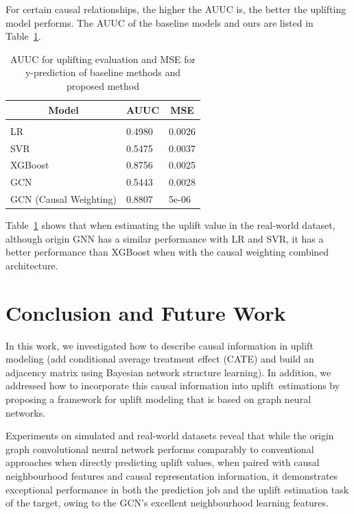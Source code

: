 \documentclass[sigconf,screen]{acmart}
\begin{document}
For certain causal relationships, the higher the AUUC is, the better the uplifting model performs. The AUUC of the baseline models and ours are listed in Table~\ref{auuc_res}.

\begin{table}
\centering
\caption{AUUC for uplifting evaluation and MSE for y-prediction of baseline methods and proposed method}
\label{auuc_res}
\begin{center}
\begin{tabular}{lll}
\multicolumn{1}{c}{\bf Model}  &\multicolumn{1}{c}{\bf AUUC} &\multicolumn{1}{c}{\bf MSE}
\\ \hline \\
LR & 0.4980 & 0.0026\\
SVR &  0.5475 & 0.0037\\
XGBoost &  0.8756 & 0.0025 \\
GCN & 0.5443 & 0.0028 \\
GCN (Causal Weighting) & 0.8807 & 5e-06 \\
\end{tabular}    
\end{center}
\end{table}

Table~\ref{auuc_res} shows that when estimating the uplift value in the real-world dataset, although origin GNN has a similar performance with LR and SVR, it has a better performance than XGBoost when with the causal weighting combined architecture.




\section{Conclusion and Future Work}
In this work, we investigated how to describe causal information in uplift modeling (add conditional average treatment effect (CATE) and build an adjacency matrix using Bayesian network structure learning). In addition, we addressed how to incorporate this causal information into uplift estimations by proposing a framework for uplift modeling that is based on graph neural networks.

Experiments on simulated and real-world datasets reveal that while the origin graph convolutional neural network performs comparably to conventional approaches when directly predicting uplift values, when paired with causal neighbourhood features and causal representation information, it demonstrates exceptional performance in both the prediction job and the uplift estimation task of the target, owing to the GCN's excellent neighbourhood learning features.
\end{document}
